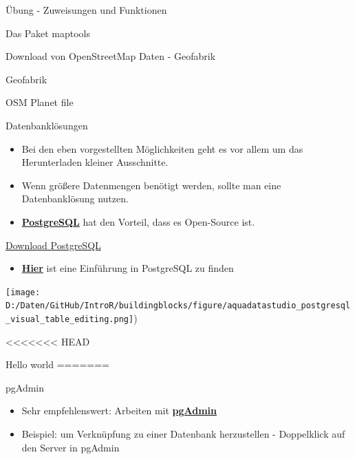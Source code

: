 \documentclass[ignorenonframetext,]{beamer}
\providecommand{\tightlist}{%
  \setlength{\itemsep}{0pt}\setlength{\parskip}{0pt}}
\begin{document}
\begin{frame}[fragile]{Übung - Zuweisungen und Funktionen}
\begin{frame}[fragile]{Das Paket maptools}
\begin{frame}{Download von OpenStreetMap Daten - Geofabrik}
\begin{block}{Geofabrik}
\end{block}

\end{frame}

\begin{frame}{OSM Planet file}

\begin{block}{Datenbanklösungen}

\begin{itemize}
\tightlist
\item
  Bei den eben vorgestellten Möglichkeiten geht es vor allem um das
  Herunterladen kleiner Ausschnitte.
\item
  Wenn größere Datenmengen benötigt werden, sollte man eine
  Datenbanklösung nutzen.
\item
  \href{http://www.postgresql.org/}{\textbf{PostgreSQL}} hat den
  Vorteil, dass es Open-Source ist.
\end{itemize}

\end{block}

\end{frame}

\begin{frame}{\href{http://www.postgresql.org/download/windows/}{Download
PostgreSQL}}

\begin{itemize}
\tightlist
\item
  \href{https://datashenanigan.wordpress.com/2015/05/18/getting-started-with-postgresql-in-r/}{\textbf{Hier}}
  ist eine Einführung in PostgreSQL zu finden
\end{itemize}

\texttt{[image: D:/Daten/GitHub/IntroR/buildingblocks/figure/aquadatastudio\_postgresql\_visual\_table\_editing.png]})

\end{frame}

<<<<<<< HEAD
\begin{frame}[fragile]{Hello world}
\protect\hypertarget{hello-world}{}
=======
\begin{frame}{pgAdmin}

\begin{itemize}
\tightlist
\item
  Sehr empfehlenswert: Arbeiten mit
  \href{https://www.pgadmin.org/}{\textbf{pgAdmin}}
\item
  Beispiel: um Verknüpfung zu einer Datenbank herzustellen - Doppelklick
  auf den Server in pgAdmin
\end{itemize}


\end{frame}
\end{frame}
\end{frame}
\end{frame}
\end{document}
